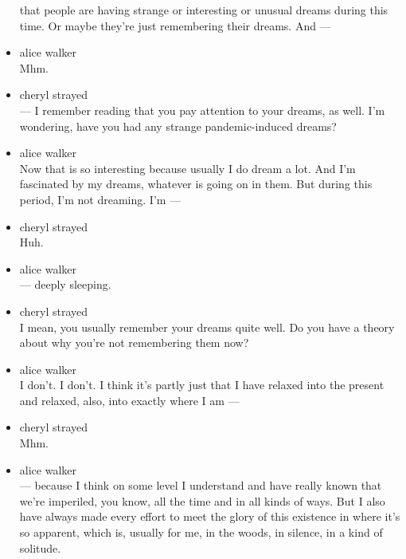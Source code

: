 \begin{itemize}
  that people are having strange or interesting or unusual dreams during
  this time. Or maybe they're just remembering their dreams. And ---
\item
  alice walker\\
  Mhm.
\item
  cheryl strayed\\
  --- I remember reading that you pay attention to your dreams, as well.
  I'm wondering, have you had any strange pandemic-induced dreams?
\item
  alice walker\\
  Now that is so interesting because usually I do dream a lot. And I'm
  fascinated by my dreams, whatever is going on in them. But during this
  period, I'm not dreaming. I'm ---
\item
  cheryl strayed\\
  Huh.
\item
  alice walker\\
  --- deeply sleeping.
\item
  cheryl strayed\\
  I mean, you usually remember your dreams quite well. Do you have a
  theory about why you're not remembering them now?
\item
  alice walker\\
  I don't. I don't. I think it's partly just that I have relaxed into
  the present and relaxed, also, into exactly where I am ---
\item
  cheryl strayed\\
  Mhm.
\item
  alice walker\\
  --- because I think on some level I understand and have really known
  that we're imperiled, you know, all the time and in all kinds of ways.
  But I also have always made every effort to meet the glory of this
  existence in where it's so apparent, which is, usually for me, in the
  woods, in silence, in a kind of solitude.


\end{itemize}
